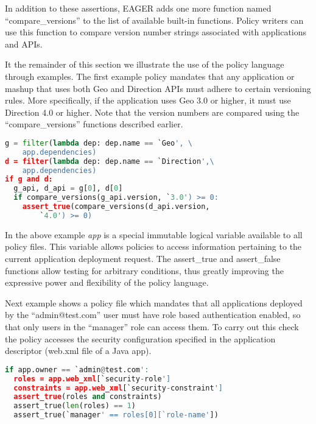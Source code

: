 In addition to these assertions, EAGER adds one more function
named ``compare\_versions'' to the list of available built-in functions. Policy
writers can use this function to compare version number strings associated with
applications and APIs.


It the remainder of this section we illustrate the use of the policy language
through examples.
The first example policy mandates that any application or mashup
that uses both Geo and Direction APIs must adhere to certain versioning 
rules. More specifically, if the application uses Geo 3.0 or higher, it must use
Direction 4.0 or higher. Note that the version numbers are compared using the
``compare\_versions'' functions described earlier.

\vspace{0.05in}
{\footnotesize
\begin{lstlisting}[language=Python, frame=single, showstringspaces=false]
g = filter(lambda dep: dep.name == `Geo', \
	app.dependencies)
d = filter(lambda dep: dep.name == `Direction',\
	app.dependencies)
if g and d:
  g_api, d_api = g[0], d[0]
  if compare_versions(g_api.version, `3.0') >= 0:
    assert_true(compare_versions(d_api.version, 
    	`4.0') >= 0)
\end{lstlisting}
}
\vspace{0.05in}

In the above example \textit{app} is a special immutable logical variable available to
all policy files. This variable allows policies to access information
pertaining to the current application deployment request. The assert\_true and assert\_false
functions allow testing for arbitrary conditions, thus greatly improving the expressive
power and flexibility of the policy language.

Next example shows a policy file which mandates that all applications deployed
by the ``admin@test.com'' user must have role based authentication enabled, so that only
users in the ``manager'' role can access them. To carry out this check the policy accesses
the security configuration specified in the application descriptor (web.xml file of a Java app).

\vspace{0.05in}
{\footnotesize
\begin{lstlisting}[language=Python, frame=single, showstringspaces=false]
if app.owner == `admin@test.com':
  roles = app.web_xml[`security-role']
  constraints = app.web_xml[`security-constraint']
  assert_true(roles and constraints)
  assert_true(len(roles) == 1)
  assert_true(`manager' == roles[0][`role-name'])
\end{lstlisting}
}
\vspace{0.05in}

